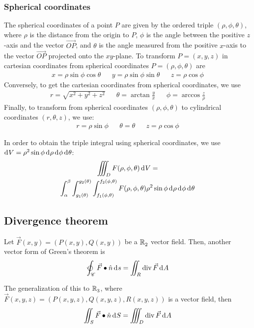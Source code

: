 \documentclass[10pt, twocolumn]{article}
\theoremstyle{remark}
\begin{document}
\subsubsection*{Spherical coordinates}
The spherical coordinates of a point \(P\) are given by the ordered triple \((\rho, \phi, \theta)\), where \(\rho\) is the distance from the origin to \(P\), \(\phi\) is the angle between the positive \(z\)-axis and the vector \(\Vec{OP}\), and \(\theta\) is the angle measured from the positive \(x\)-axis to the vector \(\Vec{OP}\) projected onto the \(xy\)-plane.
To transform \(P = (x, y, z)\) in cartesian coordinates from spherical coordinates \(P = (\rho, \phi, \theta)\) are
\begin{align*}
  x = \rho \sin\phi \cos\theta &  & y = \rho \sin\phi \sin\theta &  & z = \rho \cos\phi
\end{align*}
Conversely, to get the cartesian coordinates from spherical coordinates, we use
\begin{align*}
  r = \sqrt{x^2 + y^2 + z^2 } &  & \theta = \arctan{\frac{y}{x}} &  & \phi = \arccos{\frac{z}{\rho}}
\end{align*}
Finally, to transform from spherical coordinates \((\rho, \phi, \theta)\) to cylindrical coordinates \((r, \theta, z)\), we use:
\begin{align*}
  r = \rho \sin\phi &  & \theta = \theta &  & z = \rho \cos\phi
\end{align*}

In order to obtain the triple integral using spherical coordinates, we use \(\mathrm{d}^{} V = \rho^2 \sin\phi \,\mathrm{d}^{} \rho\,\mathrm{d}^{} \phi\,\mathrm{d}^{} \theta\):
\begin{multline*}
  \iiint_D {F(\rho, \phi, \theta) \,\mathrm{d}^{} V} = \\
  \int_{\alpha}^{\beta}{\int_{g_1 (\theta)}^{g_2 (\theta)}{\int_{f_1 (\phi, \theta)}^{f_2 (\phi, \theta)}{F(\rho, \phi, \theta) \rho^2 \sin\phi  \,\mathrm{d}^{} \rho}\,\mathrm{d}^{} \phi}\,\mathrm{d}^{} \theta}
\end{multline*}

\subsection{Divergence theorem}
Let \(\vec{F}(x, y) = (P(x, y), Q(x, y))\) be a \(\mathbb{R}_{2}^{}\) vector field.
Then, another vector form of Green's theorem is
\[
  \varointctrclockwise_{\mathscr{C}}{\vec{F} \bullet \hat{n} \diffint{s}} = \iint_R {\divergence{F} \diffint{A}}
\]

The generalization of this to \(\mathbb{R}_{3}^{}\), where  \(\vec{F}(x, y, z) = (P(x, y, z), Q(x, y, z), R(x, y, z))\) is a vector field, then
\[
  \iint_S {\vec{F} \bullet \hat{n} \,\mathrm{d}^{} S} = \iiint_D {\mathrm{div}\,\vec{F} \,\mathrm{d}^{} A}
\]
\end{document}

